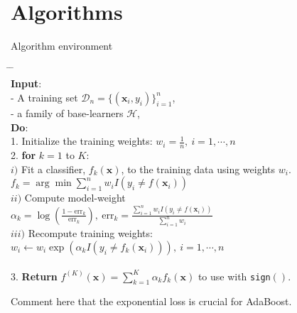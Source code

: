 \section{Algorithms}

\begin{frame}[fragile]{Algorithm environment}
\begin{algorithm}[H]
	\scriptsize{
	\begin{tabbing}
		\hspace{2em} \= \hspace{2em} \= \hspace{2em} \= \\
		{\bfseries Input}: \\
		\> - A training set $\mathcal{D}_n=\{(\mathbf{x}_i, y_{i})\}_{i=1}^n$,\\
		\> - a family of base-learners $\mathcal{H}$,\\
		
		{\bfseries Do}: \\
		1. Initialize the training weights: $w_i=\frac{1}{n},~i=1,\cdots,n$\\
		
		2. {\bfseries for} $k = 1$ to $K$: \\
		
		\>	$i)$ Fit a classifier, $f_k(\mathbf{x})$, to the training data using weights $w_i$.\\
		\>\> $f_k = \arg\min \sum_{i=1}^{n}w_i I(y_i\neq f(\mathbf{x}_i))$\\
		
		\> $ii)$ Compute model-weight\\
		\>\> $\alpha_k = \log\left( \frac{1-\text{err}_k}{\text{err}_k} \right),~
		\text{err}_k = \frac{\sum_{i=1}^{n}w_i I(y_i\neq f(\mathbf{x}_i))}{\sum_{i=1}^{n}w_i }$\\
		
		\> $iii)$ Recompute training weights:\\
		\>\> $w_i \leftarrow w_i \exp\left( \alpha_k I(y_i\neq f_k(\mathbf{x}_i))\right), ~ i=1,\cdots,n$\\
		\hspace{0.4cm}{\bfseries end for} \\
		
		3. {\bfseries Return} $f^{(K)}(\mathbf{x})=\sum_{k=1}^{K}\alpha_k f_k(\mathbf{x})$ to use with \texttt{sign}$()$.
	\end{tabbing}
Comment here that the exponential loss is crucial for AdaBoost.
\vspace{0.5cm}
\caption{\label{alg:adaboost}AdaBoost: First boosting algorithm}
}
\end{algorithm}
\end{frame}

